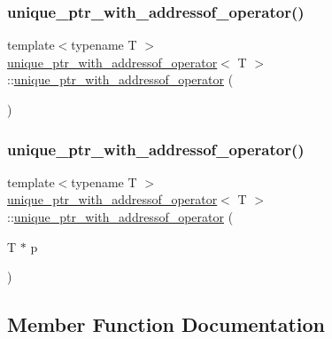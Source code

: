 \subsubsection{\texorpdfstring{unique\_ptr\_with\_addressof\_operator()}{unique\_ptr\_with\_addressof\_operator()}\hspace{0.1cm}{\footnotesize\ttfamily [1/2]}}
{\footnotesize\ttfamily template$<$typename T $>$ \\
\mbox{\hyperlink{classunique__ptr__with__addressof__operator}{unique\+\_\+ptr\+\_\+with\+\_\+addressof\+\_\+operator}}$<$ T $>$\+::\mbox{\hyperlink{classunique__ptr__with__addressof__operator}{unique\+\_\+ptr\+\_\+with\+\_\+addressof\+\_\+operator}} (\begin{DoxyParamCaption}{ }\end{DoxyParamCaption})\hspace{0.3cm}{\ttfamily [default]}}

\mbox{\label{classunique__ptr__with__addressof__operator_aec1b5d72917563f44fcd3448592f9dc0}} 
\subsubsection{\texorpdfstring{unique\_ptr\_with\_addressof\_operator()}{unique\_ptr\_with\_addressof\_operator()}\hspace{0.1cm}{\footnotesize\ttfamily [2/2]}}
{\footnotesize\ttfamily template$<$typename T $>$ \\
\mbox{\hyperlink{classunique__ptr__with__addressof__operator}{unique\+\_\+ptr\+\_\+with\+\_\+addressof\+\_\+operator}}$<$ T $>$\+::\mbox{\hyperlink{classunique__ptr__with__addressof__operator}{unique\+\_\+ptr\+\_\+with\+\_\+addressof\+\_\+operator}} (\begin{DoxyParamCaption}\item[{T $\ast$}]{p }\end{DoxyParamCaption})\hspace{0.3cm}{\ttfamily [inline]}}



\subsection{Member Function Documentation}
\mbox{\label{classunique__ptr__with__addressof__operator_a5f5c32b8a99228a7685d03ad00ec723a}} 
